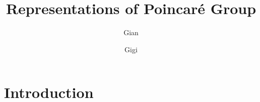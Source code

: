 \documentclass[a4paper,11pt]{book}
\title{Representations of Poincaré Group}
\author{Gian}
\author{Gigi}
\affiliation{University of Bologna}
\begin{document}
 
\maketitle
\flushbottom

\chapter{Introduction}












\end{document}
